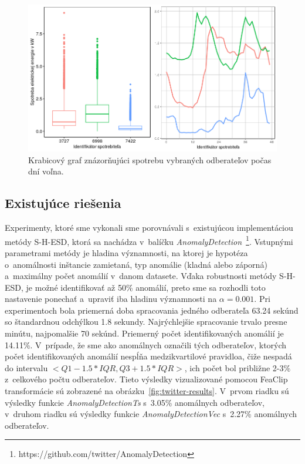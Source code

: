 \documentclass[a4paper,twoside,slovak,12pt,appendix]{article}
\begin{document}
\begin{figure}[htbp]
  \centering
  \includegraphics[width=\textwidth]{holidays_plot.png}
  \caption{Krabicový graf znázorňujúci spotrebu vybraných odberateľov počas dní voľna.}
  \label{fig:holidays-plot}
\end{figure}

\subsection{Existujúce riešenia}
Experimenty, ktoré sme vykonali sme porovnávali s~existujúcou implementáciou
metódy S-H-ESD, ktorá sa nachádza v~balíčku
\textit{AnomalyDetection}~\footnote{https://github.com/twitter/AnomalyDetection}.
Vstupnými parametrami metódy je hladina významnosti, na ktorej je hypotéza
o~anomálnosti inštancie zamietaná, typ anomálie (kladná alebo záporná)
a~maximálny počet anomálií v~danom datasete. Vďaka robustnosti metódy S-H-ESD,
je možné identifikovať až 50\% anomálií, preto sme sa rozhodli toto nastavenie
ponechať a~upraviť iba hladinu významnosti na $\alpha = 0.001$. Pri
experimentoch bola priemerná doba spracovania jedného odberateľa 63.24 sekúnd so
štandardnou odchýlkou 1.8 sekundy. Najrýchlejšie spracovanie trvalo presne
minútu, najpomalšie 70 sekúnd. Priemerný počet identifikovaných anomálií je
14.11\%. V~prípade, že sme ako anomálnych označili tých odberateľov, ktorých
počet identifikovaných anomálií nespĺňa medzikvartilové pravidloa, čiže nespadá
do intervalu $<Q1 - 1.5 * IQR, Q3 + 1.5 * IQR>$, ich počet bol približne 2-3\%
z~celkového počtu odberateľov. Tieto výsledky vizualizované pomocou FeaClip
transformácie sú zobrazené na obrázku~\ref{fig:twitter-results}. V~prvom riadku
sú výsledky funkcie \textit{AnomalyDetectionTs} s~3.05\% anomálnych odberateľov,
v~druhom riadku sú výsledky funkcie \textit{AnomalyDetectionVec} s~2.27\%
anomálnych odberateľov.
\end{document}

